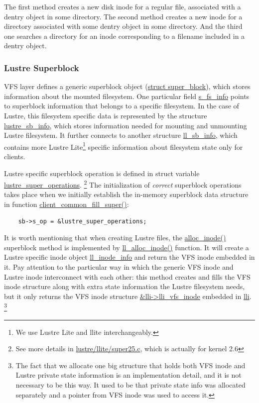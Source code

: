The first method creates a new disk inode for a regular file, associated
with a dentry object in some directory. The second method creates a new
inode for a directory associated with some dentry object in some
directory. And the third one searches a directory for an inode
corresponding to a filename included in a dentry object.

\subsubsection{Lustre Superblock}

VFS layer defines a generic superblock object (\url{struct super_block}),
which stores information about the mounted filesystem. One particular field
\url{s_fs_info} points to superblock information that belongs to a specific
filesystem. In the case of Lustre, this filesystem specific data is
represented by the structure \url{lustre_sb_info}, which stores information
needed for mounting and unmounting Lustre filesystem. It further connects to
another structure \url{ll_sb_info}, which contains more Lustre
Lite\footnote{We use Lustre Lite and llite interchangeably.} specific
information about filesystem state only for clients.

Lustre specific superblock operation is defined in struct variable
\url{lustre_super_operations}. \footnote{See more details in
\url{lustre/llite/super25.c}, which is actually for kernel 2.6} The initialization of
\textit{correct} superblock operations takes place when we initially
establish the in-memory superblock data structure in function
\url{client_common_fill_super()}:

\begin{Verbatim}
    sb->s_op = &lustre_super_operations;
\end{Verbatim}

It is worth mentioning that when creating Lustre files, the
\url{alloc_inode()} superblock method is implemented by \url{ll_alloc_inode()}
function. It will create a Lustre specific inode object \url{ll_inode_info} and
return the VFS inode embedded in it. Pay attention to the particular way in
which the generic VFS inode and Lustre inode interconnect with each other:
this method creates and fills the VFS inode structure along with extra state
information the Lustre filesystem needs, but it only returns the VFS inode
structure \url{&lli->lli_vfs_inode} embedded in \url{lli}. \footnote{The fact
that we allocate one big structure that holds both VFS inode and Lustre
private state information is an implementation detail, and it is not necessary
to be this way.  It used to be that private state info was allocated
separately and a pointer from VFS inode was used to access it.}

